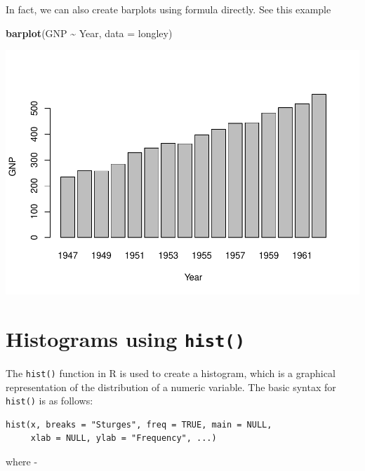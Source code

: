\documentclass[
]{book}
\newenvironment{Shaded}{\begin{snugshade}}{\end{snugshade}}
\newcommand{\AttributeTok}[1]{\textcolor[rgb]{0.13,0.29,0.53}{#1}}
\newcommand{\FunctionTok}[1]{\textcolor[rgb]{0.13,0.29,0.53}{\textbf{#1}}}
\newcommand{\NormalTok}[1]{#1}
\newcommand{\SpecialCharTok}[1]{\textcolor[rgb]{0.81,0.36,0.00}{\textbf{#1}}}
\begin{document}
In fact, we can also create barplots using formula directly. See this example

\begin{Shaded}
\begin{Highlighting}[]
\FunctionTok{barplot}\NormalTok{(GNP }\SpecialCharTok{\textasciitilde{}}\NormalTok{ Year, }\AttributeTok{data =}\NormalTok{ longley)}
\end{Highlighting}
\end{Shaded}

\begin{center}\includegraphics[height=0.55\textheight]{DauR_files/figure-latex/p10-1} \end{center}

\hypertarget{histograms-using-hist}{%
\section{\texorpdfstring{Histograms using \texttt{hist()}}{Histograms using hist()}}\label{histograms-using-hist}}

The \texttt{hist()} function in R is used to create a histogram, which is a graphical representation of the distribution of a numeric variable. The basic syntax for \texttt{hist()} is as follows:

\begin{verbatim}
hist(x, breaks = "Sturges", freq = TRUE, main = NULL,
     xlab = NULL, ylab = "Frequency", ...)
\end{verbatim}

where -
\end{document}
